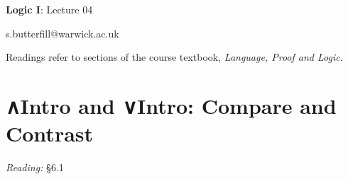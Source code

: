 \documentclass[12pt]{extarticle}
\date{}
\makeatletter
\def \ititle {Origins of Mind}
\def \isubtitle {Lecture 08}
\def \iemail{s.butterfill@warwick.ac.uk}
\makeatother
\begin{document}

\begin{multicols*}{3}

\setlength\footnotesep{1em}








\def \ititle {Logic I}
 
\def \isubtitle {Lecture 04}
 
\begin{center}
 
{\Large
 
\textbf{\ititle}: \isubtitle
 
}
 
 
 
\iemail %
 
\end{center}
 
Readings refer to sections of the course textbook, \emph{Language, Proof and Logic}.
 
 
 
\section{∧Intro and ∨Intro: Compare and Contrast}
 
\emph{Reading:} §6.1
 

\end{multicols*}
\end{document}
